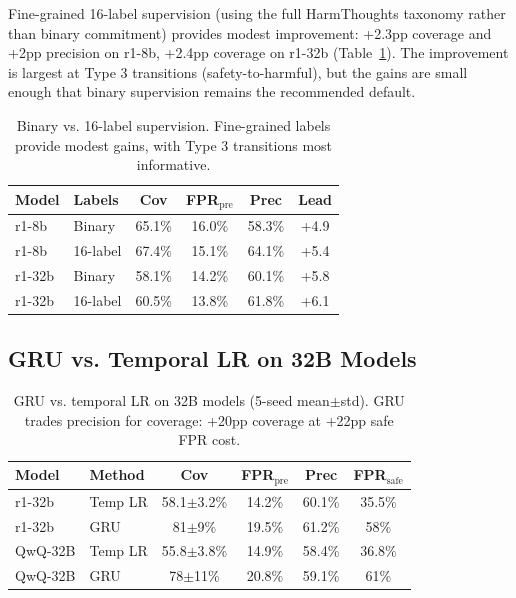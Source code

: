 \documentclass[11pt,a4paper]{article}
\begin{document}
Fine-grained 16-label supervision (using the full HarmThoughts taxonomy rather than binary commitment) provides modest improvement: +2.3pp coverage and +2pp precision on r1-8b, +2.4pp coverage on r1-32b (Table~\ref{tab:16label}). The improvement is largest at Type 3 transitions (safety-to-harmful), but the gains are small enough that binary supervision remains the recommended default.

\begin{table}[t]
\centering
\small
\caption{Binary vs. 16-label supervision. Fine-grained labels provide modest gains, with Type 3 transitions most informative.}
\label{tab:16label}
\begin{tabular}{llcccc}
\toprule
Model & Labels & Cov & FPR$_{\text{pre}}$ & Prec & Lead \\
\midrule
r1-8b & Binary & 65.1\% & 16.0\% & 58.3\% & +4.9 \\
r1-8b & 16-label & 67.4\% & 15.1\% & 64.1\% & +5.4 \\
r1-32b & Binary & 58.1\% & 14.2\% & 60.1\% & +5.8 \\
r1-32b & 16-label & 60.5\% & 13.8\% & 61.8\% & +6.1 \\
\bottomrule
\end{tabular}
\end{table}

\subsection{GRU vs. Temporal LR on 32B Models}

\begin{table}[t]
\centering
\small
\caption{GRU vs. temporal LR on 32B models (5-seed mean$\pm$std). GRU trades precision for coverage: +20pp coverage at +22pp safe FPR cost.}
\label{tab:gru_32b}
\begin{tabular}{llcccc}
\toprule
Model & Method & Cov & FPR$_{\text{pre}}$ & Prec & FPR$_{\text{safe}}$ \\
\midrule
r1-32b & Temp LR & 58.1$\pm$3.2\% & 14.2\% & 60.1\% & 35.5\% \\
r1-32b & GRU & 81$\pm$9\% & 19.5\% & 61.2\% & 58\% \\
QwQ-32B & Temp LR & 55.8$\pm$3.8\% & 14.9\% & 58.4\% & 36.8\% \\
QwQ-32B & GRU & 78$\pm$11\% & 20.8\% & 59.1\% & 61\% \\
\bottomrule
\end{tabular}
\end{table}
\end{document}
